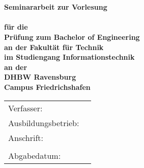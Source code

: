 \begin{titlepage}
	\begin{center}
		\vspace*{2cm}
		\LARGE\bf\myTopic\\
		\Large\rm\mySubTopic\\
		\vspace*{3cm}
		\bf Seminararbeit zur Vorlesung\\
		\myVorlesung\\
		\normalsize\rm
		\vspace*{1cm}
		für die\\
		Prüfung zum Bachelor of Engineering\\
		\vspace*{1cm}
		an der Fakultät für Technik\\
		im Studiengang Informationstechnik\\
		\vspace*{1cm}
		an der\\
		DHBW Ravensburg\\
		Campus Friedrichshafen
		\vfill
	\end{center}
	\begin{tabular}{ll}
		Verfasser:&\myAutor\\
		Ausbildungsbetrieb:&\myCompany\\
		Anschrift:&\myCompanyAddressStreet\\
		&\myCompanyAddressCity\\
		Abgabedatum:&\myEndDate\\
	\end{tabular}
\end{titlepage}
\newpage
\setcounter{page}{2}
